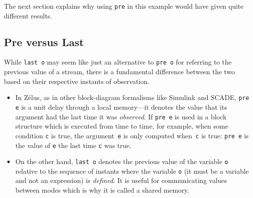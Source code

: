 \documentclass[11pt,titlepage,twoside]{report}
\makeatletter
\newcommand{\zls}[1]{{\@span{class="zelusinline"}#1}}
\newcommand{\zls}[1]{\texttt{#1}}
\renewcommand{\zls}[1]{\texttt{#1}}
\newenvironment{flatitemize}
  {\setenvclass{itemize}{flatitemize}%
   \begin{itemize}}
  {\end{itemize}}
\newenvironment{flatitemize}
  {\begin{itemize}[leftmargin=*]}
  {\end{itemize}}
\newcommand{\zelus}{{\sf Z\'elus}}
\newcommand{\simulink}{{\sf Simulink}}
\newcommand{\scade}{{\sf SCADE}}
\makeatother
\begin{document}
The next section explains why using \zls{pre} in this example would have 
given quite different results.

\subsection{Pre versus Last\label{prelast}} %

While \zls{last o} may seem like just an alternative to \zls{pre o} for 
referring to the previous value of a stream, there is a fundamental 
difference between the two based on their respective instants of 
observation.

\begin{flatitemize}
\item
In \zelus{}, as in other block-diagram formalisms like \simulink{} and 
\scade, \zls{pre e} is a unit delay through a local memory---it denotes the 
value that its argument had the last time it was \emph{observed}.
If \zls{pre e} is used in a block structure which is executed from time to 
time, for example, when some condition \zls{c} is true, the argument~\zls{e} 
is only computed when~\zls{c} is true: \zls{pre e} is the value of \zls{e} 
the last time \zls{c} was true.

\item
On the other hand, \zls{last o} denotes the previous value of the variable 
\zls{o} relative to the sequence of instants where the variable \zls{o} (it 
must be a variable and not an expression) is \emph{defined}.
It is useful for communicating values between modes which is why it is 
called a shared memory.
\end{flatitemize}
\end{document}
